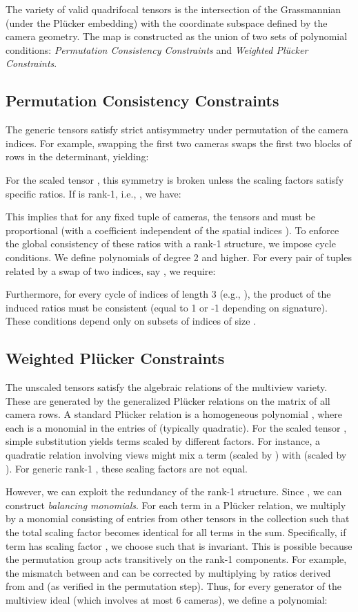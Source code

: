 \documentclass[12pt]{article}
\theoremstyle{definition}
\begin{document}
The variety of valid quadrifocal tensors is the intersection of the Grassmannian  (under the Plücker embedding) with the coordinate subspace defined by the camera geometry. The map  is constructed as the union of two sets of polynomial conditions: \emph{Permutation Consistency Constraints} and \emph{Weighted Plücker Constraints}.

\subsection{Permutation Consistency Constraints}
The generic tensors  satisfy strict antisymmetry under permutation of the camera indices. For example, swapping the first two cameras swaps the first two blocks of rows in the determinant, yielding:

For the scaled tensor , this symmetry is broken unless the scaling factors satisfy specific ratios. If  is rank-1, i.e., , we have:

This implies that for any fixed tuple of cameras, the tensors  and  must be proportional (with a coefficient independent of the spatial indices ). To enforce the global consistency of these ratios with a rank-1 structure, we impose cycle conditions.
We define polynomials  of degree 2 and higher. For every pair of tuples related by a swap of two indices, say , we require:

Furthermore, for every cycle of indices of length 3 (e.g., ), the product of the induced ratios must be consistent (equal to 1 or -1 depending on signature). These conditions depend only on subsets of indices of size .

\subsection{Weighted Plücker Constraints}
The unscaled tensors  satisfy the algebraic relations of the multiview variety. These are generated by the generalized Plücker relations on the  matrix of all camera rows. A standard Plücker relation is a homogeneous polynomial , where each  is a monomial in the entries of  (typically quadratic).
For the scaled tensor , simple substitution yields terms scaled by different factors. For instance, a quadratic relation involving views  might mix a term  (scaled by ) with  (scaled by ). For generic rank-1 , these scaling factors are not equal.

However, we can exploit the redundancy of the rank-1 structure. Since , we can construct \emph{balancing monomials}. For each term  in a Plücker relation, we multiply by a monomial  consisting of entries from other tensors in the collection such that the total scaling factor becomes identical for all terms in the sum.
Specifically, if term  has scaling factor , we choose  such that  is invariant. This is possible because the permutation group acts transitively on the rank-1 components. For example, the mismatch between  and  can be corrected by multiplying by ratios derived from  and  (as verified in the permutation step).
Thus, for every generator  of the multiview ideal (which involves at most 6 cameras), we define a polynomial:
\end{document}
